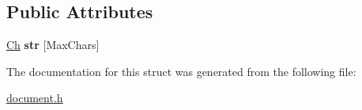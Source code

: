 \subsection*{Public Attributes}
\begin{DoxyCompactItemize}
\item 
\hyperlink{a00130_ade0e0ce64ccd5d852da57a35e720bafb}{Ch} {\bfseries str} \mbox{[}Max\+Chars\mbox{]}\hypertarget{a00273_a444e24523d4cc33830d18a2cfcfd333b}{}\label{a00273_a444e24523d4cc33830d18a2cfcfd333b}

\end{DoxyCompactItemize}


The documentation for this struct was generated from the following file\+:\begin{DoxyCompactItemize}
\item 
\hyperlink{a00473}{document.\+h}\end{DoxyCompactItemize}
